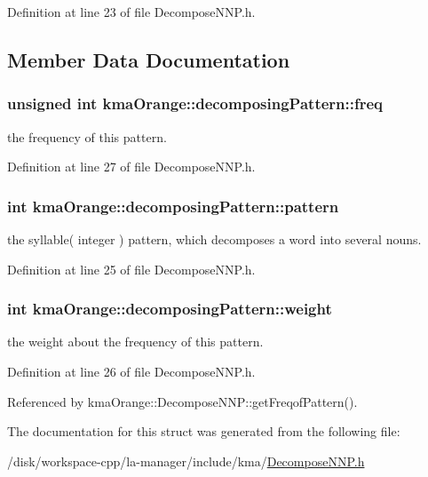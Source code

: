 Definition at line 23 of file DecomposeNNP.h.

\subsection{Member Data Documentation}
\hypertarget{structkmaOrange_1_1decomposingPattern_ff7d9c9fbf02ebaebd7a38b77d711ac6}{
\subsubsection[{freq}]{\setlength{\rightskip}{0pt plus 5cm}unsigned int {\bf kmaOrange::decomposingPattern::freq}}}
\label{structkmaOrange_1_1decomposingPattern_ff7d9c9fbf02ebaebd7a38b77d711ac6}


the frequency of this pattern. 



Definition at line 27 of file DecomposeNNP.h.\hypertarget{structkmaOrange_1_1decomposingPattern_ecc5c9a58e3605a00a1c4d44b52fdeb6}{
\subsubsection[{pattern}]{\setlength{\rightskip}{0pt plus 5cm}int {\bf kmaOrange::decomposingPattern::pattern}}}
\label{structkmaOrange_1_1decomposingPattern_ecc5c9a58e3605a00a1c4d44b52fdeb6}


the syllable( integer ) pattern, which decomposes a word into several nouns. 



Definition at line 25 of file DecomposeNNP.h.\hypertarget{structkmaOrange_1_1decomposingPattern_f5dd3d946ab260f3f457f9366d5ce1ec}{
\subsubsection[{weight}]{\setlength{\rightskip}{0pt plus 5cm}int {\bf kmaOrange::decomposingPattern::weight}}}
\label{structkmaOrange_1_1decomposingPattern_f5dd3d946ab260f3f457f9366d5ce1ec}


the weight about the frequency of this pattern. 



Definition at line 26 of file DecomposeNNP.h.

Referenced by kmaOrange::DecomposeNNP::getFreqofPattern().

The documentation for this struct was generated from the following file:\begin{CompactItemize}
\item 
/disk/workspace-cpp/la-manager/include/kma/\hyperlink{DecomposeNNP_8h}{DecomposeNNP.h}\end{CompactItemize}
